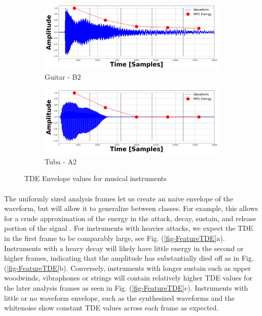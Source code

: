 \documentclass[12pt,letterpaper]{article}
\begin{document}
\begin{figure}[H]
	\begin{subfigure}[b]{0.45\textwidth}
	\begin{center}
	\includegraphics[width=1.0\linewidth]{../FiguresSpectrogram/GUITAR-B2_TDE}
	\caption{Guitar - B2}
	\end{center}
	\end{subfigure}	
	\hfill
	\begin{subfigure}[b]{0.45\textwidth}
	\begin{center}
	\includegraphics[width=1.0\linewidth]{../FiguresSpectrogram/Tuba-A2_TDE}
	\caption{Tuba - A2}
	\end{center}
	\end{subfigure}
	\caption{TDE Envelope values for musical instruments}
	\label{fig-ExampleTDE}
\end{figure}

\paragraph*{}The uniformly sized analysis frames let us create an naive envelope of the waveform, but will allow it to generalize between classes. For example, this allows for a crude approximation of the energy in the attack, decay, sustain, and release portion of the signal \cite{Virtanen,Olson}. For instruments with heavier attacks, we expect the TDE in the first frame to be comparably large, see Fig. (\ref{fig-FeatureTDE}a). Instruments with a heavy decay will likely have little energy in the second or higher frames, indicating that the amplitude has substantially died off as in Fig. (\ref{fig-FeatureTDE}b). Conversely, instruments with longer sustain such as upper woodwinds, vibraphones or strings will contain relatively higher TDE values for the later analysis frames as seen in Fig. (\ref{fig-FeatureTDE}c). Instruments with little or no waveform envelope, such as the synthesized waveforms and the whitenoise show constant TDE values across each frame as expected.
\end{document}
